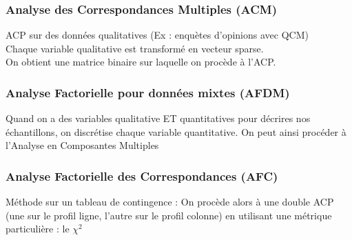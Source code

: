 
\begin{frame}
  \frametitle{Analyse des Correspondances Multiples (ACM)}
  ACP sur des données qualitatives (Ex : enquètes d'opinions avec QCM) \\
  Chaque variable qualitative est transformé en vecteur sparse. \\
  On obtient une matrice binaire sur laquelle on procède à l'ACP.\\
\end{frame}

\begin{frame}
  \frametitle{Analyse Factorielle pour données mixtes (AFDM)}
  Quand on a des variables qualitative ET quantitatives pour décrires nos échantillons, on discrétise chaque variable quantitative. On peut ainsi procéder à l'Analyse en Composantes Multiples
\end{frame}

\begin{frame}
  \frametitle{Analyse Factorielle des Correspondances (AFC)}
  Méthode sur un tableau de contingence :
  On procède alors à une double ACP (une sur le profil ligne, l'autre sur le profil colonne) en utilisant une métrique particulière : le $\chi^2$
\end{frame}
